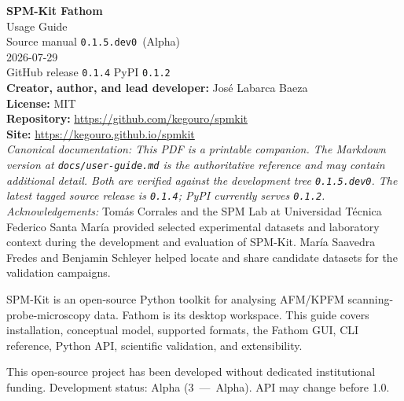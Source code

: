 \documentclass[a4paper,11pt]{article}
\begin{document}

\begin{titlepage}
\raggedright
\vspace*{4cm}

{\Huge\bfseries SPM-Kit {\textperiodcentered} Fathom}\\[0.4cm]
{\LARGE Usage Guide}\\[1.5cm]
{\large Source manual \texttt{0.1.5.dev0} \,(Alpha)}\\[0.3cm]
{\large 2026-07-29}\\[0.3cm]
{\large GitHub release \texttt{0.1.4} {\textperiodcentered} PyPI \texttt{0.1.2}}\\[2cm]

{\normalsize
  \textbf{Creator, author, and lead developer:} Jos\'e Labarca Baeza\\
  \textbf{License:} MIT\\
  \textbf{Repository:} \url{https://github.com/kegouro/spmkit}\\
  \textbf{Site:} \url{https://kegouro.github.io/spmkit}\\[1cm]

  \emph{Canonical documentation: This PDF is a printable companion. The Markdown
  version at \texttt{docs/user-guide.md} is the authoritative reference and may
  contain additional detail. Both are verified against the development tree
  \texttt{0.1.5.dev0}. The latest tagged source release is \texttt{0.1.4}; PyPI
  currently serves \texttt{0.1.2}.}
  \\[0.6cm]
  \emph{Acknowledgements:} Tom\'as Corrales and the SPM Lab at Universidad T\'ecnica
  Federico Santa Mar\'ia provided selected experimental datasets and laboratory context
  during the development and evaluation of SPM-Kit. Mar\'ia Saavedra Fredes and Benjamin
  Schleyer helped locate and share candidate datasets for the validation campaigns.
}

\vspace{1cm}
{\normalsize
  SPM-Kit is an open-source Python toolkit for analysing AFM/KPFM scanning-probe-microscopy
  data. Fathom is its desktop workspace. This guide covers installation, conceptual model,
  supported formats, the Fathom GUI, CLI reference, Python API, scientific validation,
  and extensibility.
}

\vfill
{\footnotesize
  This open-source project has been developed without dedicated institutional funding.
  Development status: Alpha (3~---~Alpha). API may change before 1.0.
}
\end{titlepage}
\end{document}
